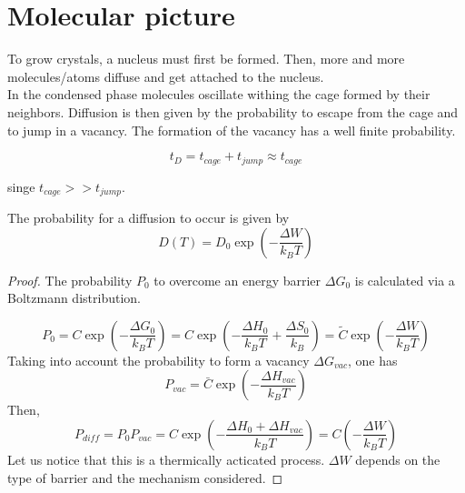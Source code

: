 \documentclass[../phys-f308.tex]{subfiles}
\begin{document}
    \section{Molecular picture}

    To grow crystals, a nucleus must first be formed. Then, more and more molecules/atoms diffuse and get attached to the nucleus.\\

    In the condensed phase molecules oscillate withing the cage formed by their neighbors. Diffusion is then given by the probability to escape from the cage and to jump in a vacancy. The formation of the vacancy has a well finite probability.

    \begin{equation}
        t_D = t_{cage}+t_{jump} \approx t_{cage}
    \end{equation}

    singe $t_{cage}>>t_{jump}$.

    \begin{property}
        The probability for a diffusion to occur is given by 
        \begin{equation}
            D(T) = D_0\exp\left(-\frac{\Delta W}{k_BT}\right)
        \end{equation}
    \end{property}
    \begin{proof}
        The probability $P_0$ to overcome an energy barrier $\Delta G_0$ is calculated via a Boltzmann distribution.

        \begin{equation}
            P_0 = C\exp\left(-\frac{\Delta G_0}{k_BT}\right) = C\exp\left(-\frac{\Delta H_0}{k_BT}+\frac{\Delta S_0}{k_B}\right) = \tilde{C}\exp\left(-\frac{\Delta W}{k_BT}\right)
        \end{equation}
        Taking into account the probability to form a vacancy $\Delta G_{vac}$, one has
        \begin{equation}
            P_{vac} = \bar{C}\exp\left(-\frac{\Delta H_{vac}}{k_BT}\right)
        \end{equation}
        Then,
        \begin{equation}
            P_{diff} = P_0P_{vac} = C\exp\left(-\frac{\Delta H_0+\Delta H_{vac}}{k_BT}\right) = C\left(-\frac{\Delta W}{k_BT}\right)
        \end{equation}
        Let us notice that this is a thermically acticated process. $\Delta W$ depends on the type of barrier and the mechanism considered.
    \end{proof}
\end{document}
